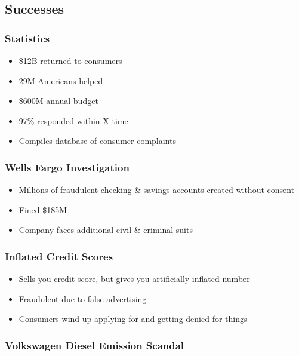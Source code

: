 \documentclass[11pt]{article}
\begin{document}
\subsection{Successes}
\label{sec:orgfdf2e1a}

\subsubsection{Statistics}
\label{sec:org651c394}

\begin{itemize}
\item \$12B returned to consumers
\item 29M Americans helped
\item \$600M annual budget
\item 97\% responded within X time
\item Compiles database of consumer complaints
\end{itemize}

\subsubsection{Wells Fargo Investigation}
\label{sec:orgdcfc87c}

\begin{itemize}
\item Millions of fraudulent checking \& savings accounts created without consent
\item Fined \$185M
\item Company faces additional civil \& criminal suits
\end{itemize}

\subsubsection{Inflated Credit Scores}
\label{sec:org6d4c9fb}

\begin{itemize}
\item Sells you credit score, but gives you artificially inflated number
\item Fraudulent due to false advertising
\item Consumers wind up applying for and getting denied for things
\end{itemize}

\subsubsection{Volkswagen Diesel Emission Scandal}
\label{sec:orgf19dd10}
\end{document}
